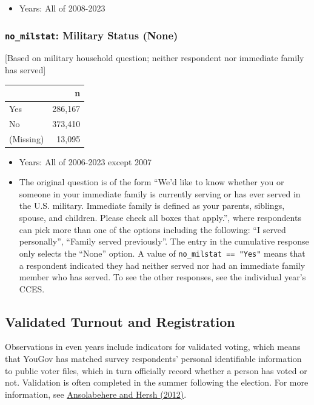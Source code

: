 \documentclass[10pt,article,oneside]{memoir}
\theoremstyle{definition}
\begin{document}
\begin{itemize}
\tightlist
\item
  Years: All of 2008-2023
\end{itemize}

\subsubsection{\texorpdfstring{\texttt{no\_milstat}: Military Status
(None)}{no\_milstat: Military Status (None)}}\label{no_milstat-military-status-none}

{[}Based on military household question; neither respondent nor
immediate family has served{]}

\begin{table}[H]
\centering
\begin{tabular}[t]{lr}
\toprule
 & n\\
\midrule
Yes & 286,167\\
No & 373,410\\
(Missing) & 13,095\\
\bottomrule
\end{tabular}
\end{table}

\begin{itemize}
\tightlist
\item
  Years: All of 2006-2023 except 2007
\item
  The original question is of the form ``We'd like to know whether you
  or someone in your immediate family is currently serving or has ever
  served in the U.S. military. Immediate family is defined as your
  parents, siblings, spouse, and children. Please check all boxes that
  apply.'', where respondents can pick more than one of the options
  including the following: ``I served personally'', ``Family served
  previously''. The entry in the cumulative response only selects the
  ``None'' option. A value of \texttt{no\_milstat\ ==\ "Yes"} means that
  a respondent indicated they had neither served nor had an immediate
  family member who has served. To see the other responses, see the
  individual year's CCES.
\end{itemize}

\subsection{Validated Turnout and
Registration}\label{validated-turnout-and-registration}

Observations in even years include indicators for validated voting,
which means that YouGov has matched survey respondents' personal
identifiable information to public voter files, which in turn officially
record whether a person has voted or not. Validation is often completed
in the summer following the election. For more information, see
\href{https://doi.org/10.1093/pan/mps023}{Ansolabehere and Hersh
(2012)}.
\end{document}
